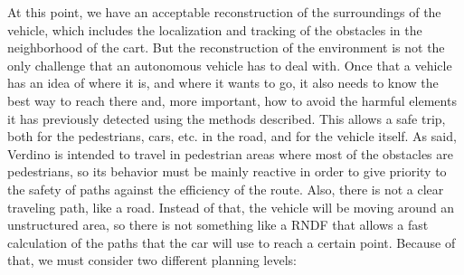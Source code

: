 At this point, we have an acceptable reconstruction of the surroundings of the vehicle, which includes the localization and tracking of the obstacles in the neighborhood of the cart. But the reconstruction of the environment is not the only challenge that an autonomous vehicle has to deal with. Once that a vehicle has an idea of where it is, and where it wants to go, it also needs to know the best way to reach there and, more important, how to avoid the harmful elements it has previously detected using the methods described. This allows a safe trip, both for the pedestrians, cars, etc. in the road, and for the vehicle itself.
As said, Verdino is intended to travel in pedestrian areas where most of the obstacles are pedestrians, so its behavior must be mainly reactive in order to give priority to the safety of paths against the efficiency of the route. Also, there is not a clear traveling path, like a road. Instead of that, the vehicle will be moving around an unstructured area, so there is not something like a \acf{RNDF} that allows a fast calculation of the paths that the car will use to reach a certain point. Because of that, we must consider two different planning levels:
